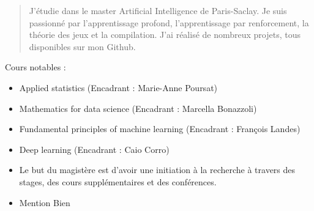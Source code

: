 \documentclass[10pt,a4paper,ragged2e,withhyper]{altacv}
\begin{document}
\begin{paracol}{2}
        
        
        \newpage
        
        \switchcolumn
        
            \begin{quote}
                J'étudie dans le master Artificial Intelligence de Paris-Saclay.
                Je suis passionné par l'apprentissage profond, l'apprentissage par renforcement,
                la théorie des jeux et la compilation.
                J'ai réalisé de nombreux projets, tous disponibles sur mon Github.
            \end{quote}
        
        
            Cours notables :
            \vspace{2pt}
            \begin{itemize}
                \item Applied statistics (Encadrant : Marie-Anne Poursat)
                \item Mathematics for data science (Encadrant : Marcella Bonazzoli)
                \item Fundamental principles of machine learning (Encadrant : François Landes)
                \item Deep learning (Encadrant : Caio Corro)
            \end{itemize}
            \divider

            \begin{itemize}
              \item Le but du magistère est d'avoir une initiation à la recherche à travers des stages, des cours supplémentaires et des conférences.
              \item Mention Bien
            \end{itemize}
            \divider


\end{paracol}
\end{document}
